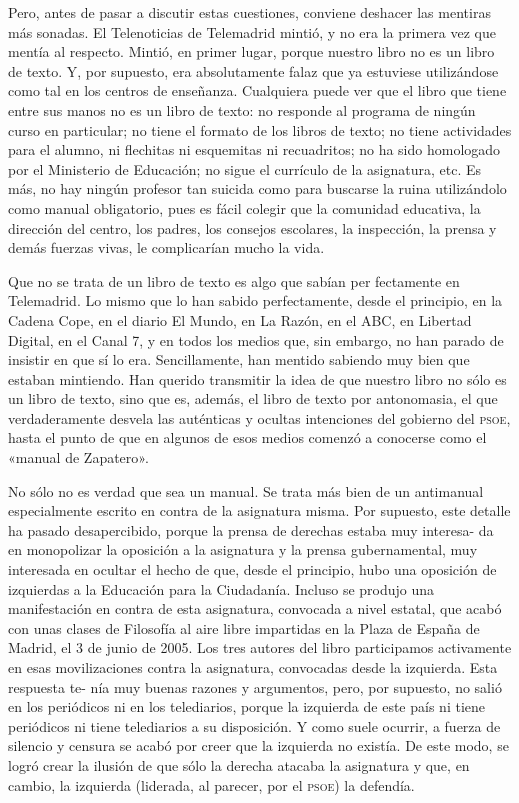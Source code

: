 \documentclass[draft,9pt,letterpaper,twocolumn,openany]{extbook}
\begin{document}
Pero, antes de pasar a discutir estas cuestiones, conviene deshacer las mentiras más sonadas. El Telenoticias de Telemadrid mintió, y no era la primera vez que
mentía al respecto. Mintió, en primer lugar, porque nuestro libro no es un libro de texto. Y, por supuesto, era absolutamente falaz que ya estuviese utilizándose como tal
en los centros de enseñanza. Cualquiera puede ver que el libro que tiene entre sus
manos no es un libro de texto: no responde al programa de ningún curso en particular; no tiene el formato de los libros de texto; no tiene actividades para el alumno,
ni flechitas ni esquemitas ni recuadritos; no ha sido homologado por el Ministerio
de Educación; no sigue el currículo de la asignatura, etc. Es más, no hay ningún
profesor tan suicida como para buscarse la ruina utilizándolo como manual obligatorio, pues es fácil colegir que la comunidad educativa, la dirección del centro, los
padres, los consejos escolares, la inspección, la prensa y demás fuerzas vivas, le
complicarían mucho la vida.

Que no se trata de un libro de texto es algo que sabían per fectamente en Telemadrid. Lo mismo que lo han sabido perfectamente, desde el principio, en la Cadena
Cope, en el diario El Mundo, en La Razón, en el ABC, en Libertad Digital, en el
Canal 7, y en todos los medios que, sin embargo, no han parado de insistir en
que sí lo era. Sencillamente, han mentido sabiendo muy bien que estaban mintiendo. Han querido transmitir la idea de que nuestro libro no sólo es un libro de
texto, sino que es, además, el libro de texto por antonomasia, el que verdaderamente desvela las auténticas y ocultas intenciones del gobierno del \textsc{psoe}, hasta
el punto de que en algunos de esos medios comenzó a conocerse como el «manual de Zapatero».

No sólo no es verdad que sea un manual. Se trata más bien de un antimanual
especialmente escrito en contra de la asignatura misma. Por supuesto, este detalle ha pasado desapercibido, porque la prensa de derechas estaba muy interesa-
da en monopolizar la oposición a la asignatura y la prensa gubernamental, muy interesada en ocultar el hecho de que, desde el principio, hubo una oposición de
izquierdas a la Educación para la Ciudadanía. Incluso se produjo una manifestación en contra de esta asignatura, convocada a nivel estatal, que acabó con unas
clases de Filosofía al aire libre impartidas en la Plaza de España de Madrid, el 3 de
junio de 2005. Los tres autores del libro participamos activamente en esas movilizaciones contra la asignatura, convocadas desde la izquierda. Esta respuesta te-
nía muy buenas razones y argumentos, pero, por supuesto, no salió en los periódicos ni en los telediarios, porque la izquierda de este país ni tiene periódicos ni
tiene telediarios a su disposición. Y como suele ocurrir, a fuerza de silencio y censura se acabó por creer que la izquierda no existía. De este modo, se logró crear
la ilusión de que sólo la derecha atacaba la asignatura y que, en cambio, la izquierda (liderada, al parecer, por el \textsc{psoe}) la defendía.
\end{document}
